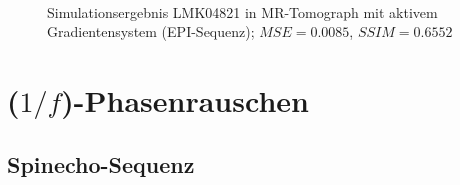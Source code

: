 \begin{figure}[H]
	\centering
	\
	\caption[LMK04821 in MR-Tomograph mit aktivem Gradientensystem (EPI) (3)]{Simulationsergebnis LMK04821 in MR-Tomograph mit aktivem Gradientensystem (EPI-Sequenz); $MSE=0.0085$, $SSIM=0.6552$}
	\label{fig:resLMKepi3}	
\end{figure}






\section{($1/f$)-Phasenrauschen}

\subsection{Spinecho-Sequenz}

